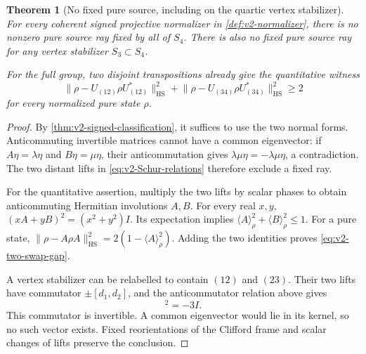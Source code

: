 \documentclass[11pt]{article}
\newtheorem{theorem}{Theorem}[section]
\theoremstyle{definition}
\theoremstyle{remark}
\newcommand{\HS}{\mathrm{HS}}
\newcommand{\norm}[1]{\lVert#1\rVert}
\begin{document}
\begin{theorem}[No fixed pure source, including on the quartic vertex stabilizer]
\label{thm:v2-no-pure}
For every coherent signed projective normalizer in
\cref{def:v2-normalizer}, there is no nonzero pure source ray fixed by all
of $S_4$. There is also no fixed pure source ray for any vertex stabilizer
$S_3\subset S_4$.

For the full group, two disjoint transpositions already give the
quantitative witness
\begin{equation}
 \norm{\rho-U_{(12)}\rho U_{(12)}^*}_{\HS}^2+
 \norm{\rho-U_{(34)}\rho U_{(34)}^*}_{\HS}^2\ge2
 \label{eq:v2-two-swap-gap}
\end{equation}
for every normalized pure state $\rho$.
\end{theorem}
\begin{proof}
By \cref{thm:v2-signed-classification}, it suffices to use the two normal
forms. Anticommuting invertible matrices cannot have a common eigenvector:
if $A\eta=\lambda\eta$ and $B\eta=\mu\eta$, their anticommutation gives
$\lambda\mu\eta=-\lambda\mu\eta$, a contradiction. The two distant
lifts in \eqref{eq:v2-Schur-relations} therefore exclude a fixed ray.

For the quantitative assertion, multiply the two lifts by scalar phases to
obtain anticommuting Hermitian involutions $A,B$. For every real $x,y$,
$(xA+yB)^2=(x^2+y^2)I$. Its expectation implies
$\langle A\rangle_\rho^2+\langle B\rangle_\rho^2\le1$.
For a pure state,
$\norm{\rho-A\rho A}_{\HS}^2=2(1-\langle A\rangle_\rho^2)$.
Adding the two identities proves \eqref{eq:v2-two-swap-gap}.

A vertex stabilizer can be relabelled to contain $(12)$ and $(23)$.
Their two lifts have commutator
$\pm[d_1,d_2]$, and the anticommutator relation above gives
\begin{equation}
 [u_1^{(k)},u_2^{(k)}]^2=-3I.
 \label{eq:v2-S3-commutator}
\end{equation}
This commutator is invertible. A common eigenvector would lie in its
kernel, so no such vector exists. Fixed reorientations of the Clifford
frame and scalar changes of lifts preserve the conclusion.
\end{proof}
\end{document}
